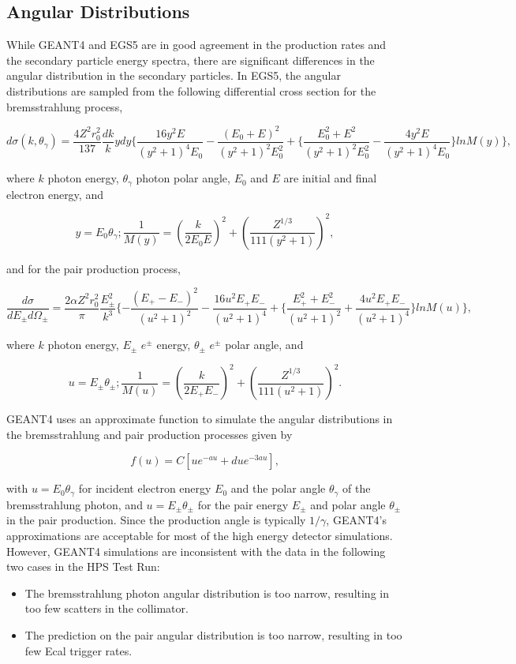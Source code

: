 \subsection*{Angular Distributions}

While GEANT4 and EGS5 are in good agreement in the production rates and the secondary particle
energy spectra, there are significant differences in the angular distribution in the secondary
particles. In EGS5, the angular distributions are sampled from the following differential
cross section for the bremsstrahlung process, \cite{koch}

$$d\sigma(k,\theta_\gamma) = {\frac{4Z^2r_0^2} {137}} {\frac{dk} {k}} ydy\{{\frac{16y^2E} 
{(y^2+1)^4E_0}}
 -{\frac{(E_0+E)^2} {(y^2+1)^2E_0^2}}+\{{\frac{E_0^2+E^2} {(y^2+1)^2E_0^2}} -
 {\frac{4y^2E} {(y^2+1)^4E_0}}\} lnM(y) \}, $$

\noindent
where $k$ photon energy, $\theta_\gamma$ photon polar angle, $E_0$ and $E$ are initial and final 
electron energy, and

$$y=E_0\theta_\gamma; {\frac{1} {M(y)}} = ({\frac{k} {2E_0E}})^2 + ({\frac{Z^{1/3}} {111(y^2+1)}})^2, $$

\noindent
and for the pair production process, \cite{motz}

$${\frac{d\sigma} {dE_\pm d\Omega_\pm}} = {\frac{2\alpha Z^2r_0^2} {\pi}} {\frac{E_\pm^2} {k^3}}
\{-{\frac{(E_+-E_-)^2} {(u^2+1)^2}}-{\frac{16u^2E_+E_-} {(u^2+1)^4}} + \{ {\frac{E_+^2+E_-^2} 
{(u^2+1)^2}} + {\frac{4u^2E_+E_-} {(u^2+1)^4}} \} lnM(u)\},$$

\noindent
where $k$ photon energy, $E_\pm$ $e^{\pm}$ energy, $\theta_\pm$ $e^{\pm}$ polar angle, and

$$u=E_\pm\theta_\pm; {\frac{1} {M(u)}} = ({\frac{k} {2E_+E_-}})^2+({\frac{Z^{1/3}} {111(u^2+1)}})^2.$$

\noindent
GEANT4 uses an approximate function to simulate the angular distributions in the 
bremsstrahlung and pair production processes given by

$$ f(u) = C [ue^{-au} + d u e^{-3au}], $$

\noindent
with $u=E_0\theta_\gamma$ for incident electron energy $E_0$ and the polar angle 
$\theta_\gamma$ of the bremsstrahlung photon, and $u=E_{\pm}\theta_{\pm}$ for the pair 
energy $E_\pm$ and polar angle $\theta_\pm$ in the pair production. Since the production angle
is typically $1/\gamma$, GEANT4's approximations are acceptable
for most of the high energy detector simulations. However, GEANT4
simulations are inconsistent with the data in the following two cases in the HPS Test Run:
\begin{itemize}
\item The bremsstrahlung photon angular distribution is too narrow, 
resulting in too few scatters in the collimator.
\item The prediction on the pair angular distribution is too narrow, resulting in 
too few Ecal trigger rates.
\end{itemize}

